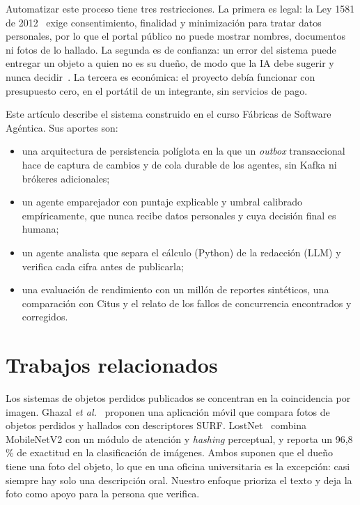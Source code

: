 \documentclass[conference]{IEEEtran}
\newcommand{\pc}{\,\%}
\begin{document}
Automatizar este proceso tiene tres restricciones. La primera es legal: la Ley 1581 de 2012~\cite{ley1581} exige consentimiento, finalidad y minimización para tratar datos personales, por lo que el portal público no puede mostrar nombres, documentos ni fotos de lo hallado. La segunda es de confianza: un error del sistema puede entregar un objeto a quien no es su dueño, de modo que la IA debe sugerir y nunca decidir~\cite{amershi2019}. La tercera es económica: el proyecto debía funcionar con presupuesto cero, en el portátil de un integrante, sin servicios de pago.

Este artículo describe el sistema construido en el curso Fábricas de Software Agéntica. Sus aportes son:
\begin{itemize}
  \item una arquitectura de persistencia políglota en la que un \emph{outbox} transaccional hace de captura de cambios y de cola durable de los agentes, sin Kafka ni brókeres adicionales;
  \item un agente emparejador con puntaje explicable y umbral calibrado empíricamente, que nunca recibe datos personales y cuya decisión final es humana;
  \item un agente analista que separa el cálculo (Python) de la redacción (LLM) y verifica cada cifra antes de publicarla;
  \item una evaluación de rendimiento con un millón de reportes sintéticos, una comparación con Citus y el relato de los fallos de concurrencia encontrados y corregidos.
\end{itemize}

\section{Trabajos relacionados}

Los sistemas de objetos perdidos publicados se concentran en la coincidencia por imagen. Ghazal \emph{et al.}~\cite{ghazal2015} proponen una aplicación móvil que compara fotos de objetos perdidos y hallados con descriptores SURF. LostNet~\cite{zhou2024lostnet} combina MobileNetV2 con un módulo de atención y \emph{hashing} perceptual, y reporta un 96,8\pc{} de exactitud en la clasificación de imágenes. Ambos suponen que el dueño tiene una foto del objeto, lo que en una oficina universitaria es la excepción: casi siempre hay solo una descripción oral. Nuestro enfoque prioriza el texto y deja la foto como apoyo para la persona que verifica.
\end{document}
